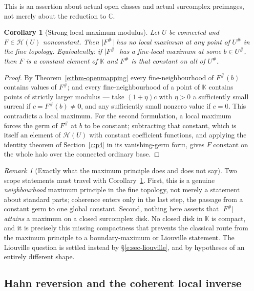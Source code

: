 \documentclass[11pt,a4paper]{article}
\numberwithin{equation}{section}
\newtheorem{corollary}[theorem]{Corollary}
\theoremstyle{definition}
\theoremstyle{remark}
\newtheorem{remark}[theorem]{Remark}
\theoremstyle{plain}
\newcommand{\K}{\mathbb K}
\newcommand{\CC}{\mathbb C}
\newcommand{\halo}[1]{#1^{\#}}
\newcommand{\ev}[1]{#1^{\#}}
\newcommand{\Hc}{\mathcal H}
\newcommand{\abs}[1]{\lvert #1\rvert}
\begin{document}
This is an assertion about actual open classes and actual surcomplex
preimages, not merely about the reduction to $\CC$.

\begin{corollary}[Strong local maximum modulus]\label{e:cor-maxmod}
Let $U$ be connected and $F\in\Hc(U)$ nonconstant.  Then $\abs{\ev F}$ has
no local maximum at any point of $\halo U$ in the fine topology.
Equivalently: if $\abs{\ev F}$ has a fine-local maximum at some
$b\in\halo U$, then $F$ is a constant element of $\K$ and $\ev F$ is that
constant on all of $\halo U$.
\end{corollary}

\begin{proof}
By Theorem~\ref{e:thm-openmapping} every fine-neighbourhood of $\ev F(b)$
contains values of $\ev F$; and every fine-neighbourhood of a point of
$\K$ contains points of strictly larger modulus --- take $(1+\eta)c$ with
$\eta>0$ a sufficiently small surreal if $c=\ev F(b)\ne0$, and any
sufficiently small nonzero value if $c=0$.  This contradicts a local
maximum.  For the second formulation, a local maximum forces the germ of
$\ev F$ at $b$ to be constant; subtracting that constant, which is itself
an element of $\Hc(U)$ with constant coefficient functions, and applying the
identity theorem of Section~\ref{c:p4} in its vanishing-germ form, gives $F$ constant
on the whole halo over the connected ordinary base.
\end{proof}

\begin{remark}[Exactly what the maximum principle does and does not say]
\label{e:rem-maxscope}
Two scope statements must travel with
Corollary~\ref{e:cor-maxmod}.  First, this is a genuine
\emph{neighbourhood} maximum principle in the fine topology, not merely a
statement about standard parts; coherence enters only in the last step,
the passage from a constant germ to one global constant.  Second, nothing
here asserts that $\abs{\ev F}$ \emph{attains} a maximum on a closed
surcomplex disk.  No closed disk in $\K$ is compact, and it is precisely
this missing compactness that prevents the classical route from the
maximum principle to a boundary-maximum or Liouville statement.  The
Liouville question is settled instead by \S\ref{e:sec-liouville}, and by
hypotheses of an entirely different shape.
\end{remark}

\subsection{Hahn reversion and the coherent local inverse}
\label{e:sec-reversion}
\end{document}

